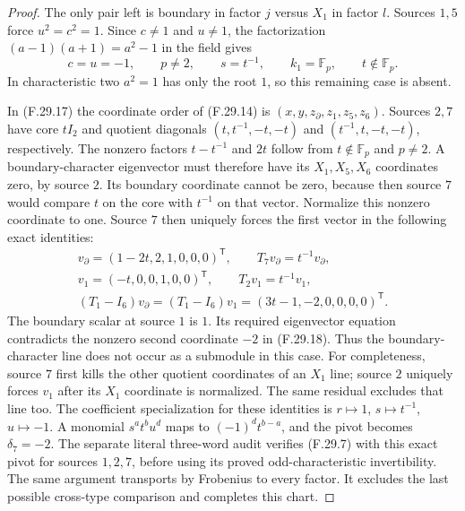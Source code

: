 \begin{proof}
The only pair left is boundary in factor $j$
versus $X_1$ in factor $l$. Sources $1,5$ force
$u^2=c^2=1$. Since $c\ne1$ and $u\ne1$,
the factorization $(a-1)(a+1)=a^2-1$ in the
field gives
\[
 c=u=-1,\qquad p\ne2,\qquad
 s=t^{-1},\qquad k_1=\mathbb F_p,\qquad
 t\notin\mathbb F_p.
                                                               \tag{F.29.17}
\]
In characteristic two $a^2=1$ has only the
root $1$, so this remaining case is absent.

In (F.29.17) the coordinate order of (F.29.14)
is $(x,y,z_\partial,z_1,z_5,z_6)$.
Sources $2,7$ have core $tI_2$ and quotient
diagonals $(t,t^{-1},-t,-t)$ and
$(t^{-1},t,-t,-t)$, respectively.
The nonzero factors $t-t^{-1}$ and $2t$ follow
from $t\notin\mathbb F_p$ and $p\ne2$.
A boundary-character eigenvector must therefore
have its $X_1,X_5,X_6$ coordinates zero, by
source $2$. Its boundary coordinate cannot be
zero, because then source $7$ would compare
$t$ on the core with $t^{-1}$ on that vector.
Normalize this nonzero coordinate to one.
Source $7$ then uniquely forces the first
vector in the following exact identities:
\[
 \begin{gathered}
 v_\partial=(1-2t,2,1,0,0,0)^{\mathsf T},
       \qquad T_7v_\partial=t^{-1}v_\partial,\\
 v_1=(-t,0,0,1,0,0)^{\mathsf T},
       \qquad T_2v_1=t^{-1}v_1,\\
 (T_1-I_6)v_\partial=(T_1-I_6)v_1
                         =(3t-1,-2,0,0,0,0)^{\mathsf T}.
 \end{gathered}                                                \tag{F.29.18}
\]
The boundary scalar at source $1$ is $1$.
Its required eigenvector equation contradicts
the nonzero second coordinate $-2$ in
(F.29.18). Thus the boundary-character line
does not occur as a submodule in this case.
For completeness, source $7$ first kills the
other quotient coordinates of an $X_1$ line;
source $2$ uniquely forces $v_1$ after its
$X_1$ coordinate is normalized. The same
residual excludes that line too.
The coefficient specialization for these
identities is $r\mapsto1$, $s\mapsto t^{-1}$,
$u\mapsto-1$. A monomial $s^a t^b u^d$ maps
to $(-1)^d t^{b-a}$, and the pivot becomes
$\delta_7=-2$. The separate literal three-word
audit verifies (F.29.7) with this exact pivot
for sources $1,2,7$, before using its proved
odd-characteristic invertibility.
The same argument transports by Frobenius
to every factor. It excludes the last possible
cross-type comparison and completes this chart.


\end{proof}
